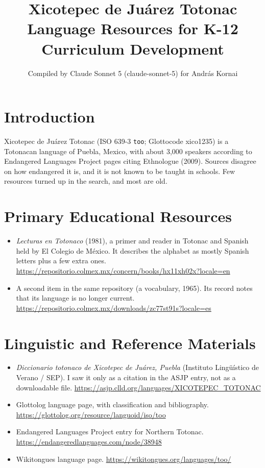 \documentclass[12pt]{article}
\title{Xicotepec de Ju\'arez Totonac Language Resources for K-12 Curriculum Development}
\author{Compiled by Claude Sonnet 5 (claude-sonnet-5) for Andr\'as Kornai}
\date{}
\begin{document}
\maketitle

\section{Introduction}
Xicotepec de Ju\'arez Totonac (ISO 639-3 \texttt{too}; Glottocode xico1235) is a Totonacan language of Puebla, Mexico, with about 3,000 speakers according to Endangered Languages Project pages citing Ethnologue (2009). Sources disagree on how endangered it is, and it is not known to be taught in schools. Few resources turned up in the search, and most are old.

\section{Primary Educational Resources}
\begin{itemize}
\item \emph{Lecturas en Totonaco} (1981), a primer and reader in Totonac and Spanish held by El Colegio de M\'exico. It describes the alphabet as mostly Spanish letters plus a few extra ones. \url{https://repositorio.colmex.mx/concern/books/hx11xh02x?locale=en}
\item A second item in the same repository (a vocabulary, 1965). Its record notes that its language is no longer current. \url{https://repositorio.colmex.mx/downloads/zc77st91s?locale=es}
\end{itemize}

\section{Linguistic and Reference Materials}
\begin{itemize}
\item \emph{Diccionario totonaco de Xicotepec de Ju\'arez, Puebla} (Instituto Ling\"u\'istico de Verano / SEP). I saw it only as a citation in the ASJP entry, not as a downloadable file. \url{https://asjp.clld.org/languages/XICOTEPEC_TOTONAC}
\item Glottolog language page, with classification and bibliography. \url{https://glottolog.org/resource/languoid/iso/too}
\item Endangered Languages Project entry for Northern Totonac. \url{https://endangeredlanguages.com/node/38948}
\item Wikitongues language page. \url{https://wikitongues.org/languages/too/}
\end{itemize}
\end{document}
